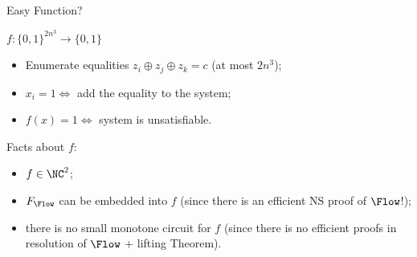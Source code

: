 \begin{frame}{Easy Function?}

    $f\colon \{0, 1\}^{2 n^3} \to \{0, 1\}$

    \begin{itemize}
        \item Enumerate equalities $z_i \oplus z_j \oplus z_k = c$ (at most $2 n^3$);
        \item $x_i = 1 \Leftrightarrow$ add the equality to the system;
        \item $f(x) = 1 \Leftrightarrow$ system is unsatisfiable.
    \end{itemize}

    \pause
    Facts about $f$:
    \begin{itemize}
        \item $f \in \NC^2$;
        \item $F_{\Flow}$ can be embedded into $f$ (since there is an efficient NS proof of $\Flow$!);
        \item there is no small monotone circuit for $f$ (since there is no efficient proofs in
            resolution of $\Flow$ + lifting Theorem).
    \end{itemize}
\end{frame}

